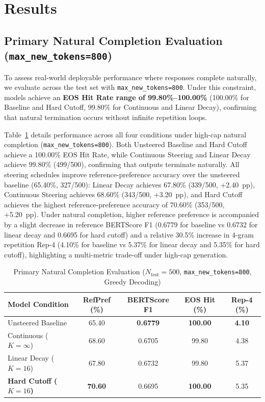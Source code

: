 \section{Results}

\subsection{Primary Natural Completion Evaluation (\texttt{max\_new\_tokens=800})}
To assess real-world deployable performance where responses complete naturally, we evaluate across the test set with \texttt{max\_new\_tokens=800}. Under this constraint, models achieve an \textbf{EOS Hit Rate range of 99.80\%--100.00\%} (100.00\% for Baseline and Hard Cutoff, 99.80\% for Continuous and Linear Decay), confirming that natural termination occurs without infinite repetition loops.

Table~\ref{tab:long_gen} details performance across all four conditions under high-cap natural completion (\texttt{max\_new\_tokens=800}). Both Unsteered Baseline and Hard Cutoff achieve a 100.00\% EOS Hit Rate, while Continuous Steering and Linear Decay achieve 99.80\% (499/500), confirming that outputs terminate naturally. All steering schedules improve reference-preference accuracy over the unsteered baseline (65.40\%, 327/500): Linear Decay achieves 67.80\% (339/500, +2.40~pp), Continuous Steering achieves 68.60\% (343/500, +3.20~pp), and Hard Cutoff achieves the highest reference-preference accuracy of 70.60\% (353/500, +5.20~pp). Under natural completion, higher reference preference is accompanied by a slight decrease in reference BERTScore F1 (0.6779 for baseline vs 0.6732 for linear decay and 0.6695 for hard cutoff) and a relative 30.5\% increase in 4-gram repetition Rep-4 (4.10\% for baseline vs 5.37\% for linear decay and 5.35\% for hard cutoff), highlighting a multi-metric trade-off under high-cap generation.

\begin{table}[t]
\caption{Primary Natural Completion Evaluation ($N_{\text{test}}=500$, \texttt{max\_new\_tokens=800}, Greedy Decoding)}
\label{tab:long_gen}
\centering
\begin{tabular}{lcccc}
\toprule
\textbf{Model Condition} & \textbf{RefPref (\%)} & \textbf{BERTScore F1} & \textbf{EOS Hit (\%)} & \textbf{Rep-4 (\%)} \\
\midrule
Unsteered Baseline & 65.40 & \textbf{0.6779} & \textbf{100.00} & \textbf{4.10} \\
Continuous ($K{=}\infty$) & 68.60 & 0.6705 & 99.80 & 4.38 \\
Linear Decay ($K{=}16$) & 67.80 & 0.6732 & 99.80 & 5.37 \\
\textbf{Hard Cutoff ($K{=}16$)} & \textbf{70.60} & 0.6695 & \textbf{100.00} & 5.35 \\
\bottomrule
\end{tabular}
\end{table}

